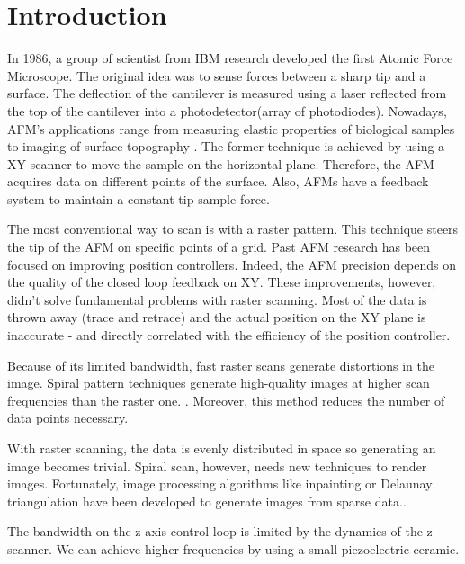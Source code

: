 \chapter{Introduction}

In 1986, a group of scientist from IBM research developed the first Atomic Force Microscope.\cite{binnig1986atomic} The original idea was to sense forces between a sharp tip and a surface. The deflection of the cantilever is measured using a laser reflected from the top of the cantilever into a photodetector(array of photodiodes). Nowadays, AFM's applications range from measuring elastic properties of biological samples to imaging of surface topography\cite{radmacher1997measuring} \cite{hansma1988scanning}. The former technique is achieved by using a XY-scanner to move the sample on the horizontal plane. Therefore, the AFM acquires data on different points of the surface. Also, AFMs have a feedback system to maintain a constant tip-sample force. 

The most conventional way to scan is with a raster pattern. This technique steers the tip of the AFM on specific points of a grid. Past AFM research has been focused on improving position controllers. Indeed, the AFM precision depends on the quality of the closed loop feedback on XY. These improvements, however, didn't solve fundamental problems with raster scanning. Most of the data is thrown away (trace and retrace) and the actual position on the XY plane is inaccurate - and directly correlated with the efficiency of the position controller.

Because of its limited bandwidth, fast raster scans generate distortions in the image.\cite{yong2010high} Spiral pattern techniques generate high-quality images at higher scan frequencies than the raster one. \cite{mahmood2009fast}. Moreover, this method reduces the number of data points necessary. \cite{nonrasterdata}

With raster scanning, the data is evenly distributed in space so generating an image becomes trivial. Spiral scan, however, needs new techniques to render images. Fortunately, image processing algorithms like inpainting \cite{richard2001fast} or Delaunay triangulation have been developed to generate images from sparse data.\cite{nonrasterdata}.

The bandwidth on the z-axis control loop is limited by the dynamics of the z scanner.\cite{jeong:093706} We can achieve higher frequencies by using a small piezoelectric ceramic.\cite{sulchek1999dual}

